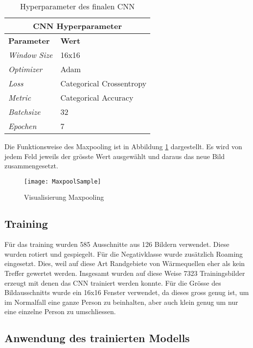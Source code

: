 {\begin{table}[H]
\begin{tabularx}{.8\textwidth}{XX}
			\multicolumn{2}{c}{\textbf{CNN Hyperparameter}}\\
			\hline
			\textbf{Parameter} &  \textbf{Wert}\\
			\hline
			\textit{Window Size} & 16x16\\
			\hline
			\textit{Optimizer} & Adam\\
			\hline  
			\textit{Loss} & Categorical Crossentropy\\
			\hline
			\textit{Metric} & Categorical Accuracy\\
			\hline
			\textit{Batchsize} & 32\\
			\hline
			\textit{Epochen} & 7\\
			\hline
		\end{tabularx}
		\caption{Hyperparameter des finalen CNN}
		\label{tbl:hyperparameter}
	\end{table}
}


\noindent Die Funktionsweise des Maxpooling ist in Abbildung \ref{fig:maxpoolSample} dargestellt. Es wird von jedem Feld jeweils der grösste Wert ausgewählt und daraus das neue Bild zusammengesetzt.

\begin{figure}[H]
	\centering
	\texttt{[image: MaxpoolSample]}
	\caption{Visualisierung Maxpooling \parencite{MaxpoolImg2018}}
	\label{fig:maxpoolSample}
\end{figure}

\subsection{Training}

Für das training wurden 585 Ausschnitte aus 126 Bildern verwendet. Diese wurden rotiert und gespiegelt. Für die Negativklasse wurde zusätzlich Roaming eingesetzt. Dies, weil auf diese Art Randgebiete von Wärmequellen eher als kein Treffer gewertet werden. Insgesamt wurden auf diese Weise 7323 Trainingsbilder erzeugt mit denen das \gls{CNN} trainiert werden konnte. Für die Grösse des Bildausschnitts wurde ein 16x16 Fenster verwendet, da dieses gross genug ist, um im Normalfall eine ganze Person zu beinhalten, aber auch klein genug um nur eine einzelne Person zu umschliessen.

\subsection{Anwendung des trainierten Modells}

